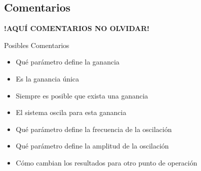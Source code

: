 \FloatBarrier
\subsection{Comentarios}


\textbf{!AQUÍ COMENTARIOS NO OLVIDAR!}

Posibles Comentarios
\begin{itemize}
    \item Qué parámetro define la ganancia
    \item Es la ganancia única
    \item Siempre es posible que exista una ganancia
    \item El sistema oscila para esta ganancia
    \item Qué parámetro define la frecuencia de la oscilación
    \item Qué parámetro define la amplitud de la oscilación
    \item Cómo cambian los resultados para otro punto de operación
\end{itemize}